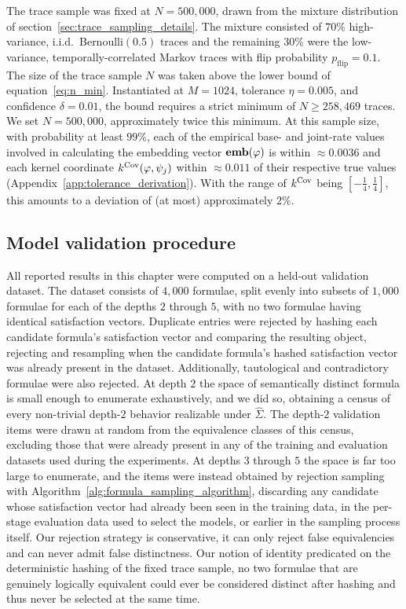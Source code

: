 \documentclass[titlepage,a4paper,11pt]{report}
\begin{document}
    The trace sample was fixed at $N = 500{,}000$, drawn from the mixture distribution of section~\ref{sec:trace_sampling_details}. The mixture consisted of $70\%$ high-variance, i.i.d.\ Bernoulli$(0.5)$ traces and the remaining $30\%$ were the low-variance, temporally-correlated Markov traces with flip probability $p_{\text{flip}}=0.1$. The size of the trace sample $N$ was taken above the lower bound of equation~\eqref{eq:n_min}. Instantiated at $M = 1024$, tolerance $\eta = 0.005$, and confidence $\delta = 0.01$, the bound requires a strict minimum of $N \ge 258{,}469$ traces. We set $N = 500{,}000$, approximately twice this minimum. At this sample size, with probability at least $99\%$, each of the empirical base- and joint-rate values involved in calculating the embedding vector $\textbf{emb}(\varphi)$ is within $\approx 0.0036$ and each kernel coordinate $k^{\mathrm{Cov}}(\varphi, \psi_j)$ within $\approx 0.011$ of their respective true values (Appendix~\ref{app:tolerance_derivation}). With the range of $k^{\mathrm{Cov}}$ being $[-\tfrac14, \tfrac14]$, this amounts to a deviation of (at most) approximately $2\%$.
    
    \subsection{Model validation procedure}\label{sec:model_validation}
    All reported results in this chapter were computed on a held-out validation dataset. The dataset consists of $4{,}000$ formulae, split evenly into subsets of $1{,}000$ formulae for each of the depths $2$ through $5$, with no two formulae having identical satisfaction vectors. Duplicate entries were rejected by hashing each candidate formula's satisfaction vector and comparing the resulting object, rejecting and resampling when the candidate formula's hashed satisfaction vector was already present in the dataset. Additionally, tautological and contradictory formulae were also rejected. At depth $2$ the space of semantically distinct formula is small enough to enumerate exhaustively, and we did so, obtaining a census of every non-trivial depth-$2$ behavior realizable under $\widehat \Sigma$. The depth-$2$ validation items were drawn at random from the equivalence classes of this census, excluding those that were already present in any of the training and evaluation datasets used during the experiments. At depths $3$ through $5$ the space is far too large to enumerate, and the items were instead obtained by rejection sampling with Algorithm~\ref{alg:formula_sampling_algorithm}, discarding any candidate whose satisfaction vector had already been seen in the training data, in the per-stage evaluation data used to select the models, or earlier in the sampling process itself. Our rejection strategy is conservative, it can only reject false equivalencies and can never admit false distinctness. Our notion of identity predicated on the  deterministic hashing of the fixed trace sample, no two formulae that are genuinely logically equivalent could ever be considered distinct after hashing and thus never be selected at the same time. 
    
\end{document}
